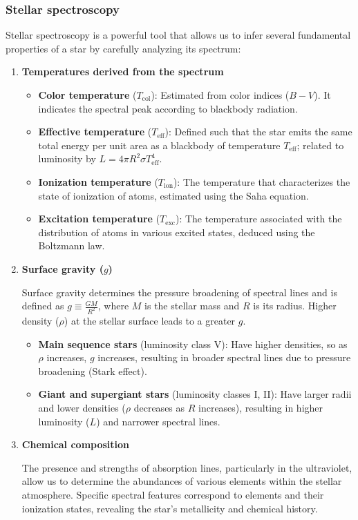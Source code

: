 \subsubsection{Stellar spectroscopy}

Stellar spectroscopy is a powerful tool that allows us to infer several fundamental properties of a star by carefully analyzing its spectrum:

\begin{enumerate}
    \item \textbf{Temperatures derived from the spectrum}
    \begin{itemize}
        \item \textbf{Color temperature} ($T_\mathrm{col}$): Estimated from color indices ($B - V$). It indicates the spectral peak according to blackbody radiation.
        \item \textbf{Effective temperature} ($T_\mathrm{eff}$): Defined such that the star emits the same total energy per unit area as a blackbody of temperature $T_\mathrm{eff}$; related to luminosity by $L = 4 \pi R^2 \sigma T_\mathrm{eff}^4$.
        \item \textbf{Ionization temperature} ($T_\mathrm{ion}$): The temperature that characterizes the state of ionization of atoms, estimated using the Saha equation.
        \item \textbf{Excitation temperature} ($T_\mathrm{exc}$): The temperature associated with the distribution of atoms in various excited states, deduced using the Boltzmann law.
    \end{itemize}

    \item \textbf{Surface gravity ($g$)} 
    
    Surface gravity determines the pressure broadening of spectral lines and is defined as $g \equiv \frac{GM}{R^2}$, where $M$ is the stellar mass and $R$ is its radius. Higher density ($\rho$) at the stellar surface leads to a greater $g$.
    
    \begin{itemize}
        \item \textbf{Main sequence stars} (luminosity class V): Have higher densities, so as $\rho$ increases, $g$ increases, resulting in broader spectral lines due to pressure broadening (Stark effect).
        \item \textbf{Giant and supergiant stars} (luminosity classes I, II): Have larger radii and lower densities ($\rho$ decreases as $R$ increases), resulting in higher luminosity ($L$) and narrower spectral lines.
    \end{itemize}

    \item \textbf{Chemical composition}
    
    The presence and strengths of absorption lines, particularly in the ultraviolet, allow us to determine the abundances of various elements within the stellar atmosphere. Specific spectral features correspond to elements and their ionization states, revealing the star's metallicity and chemical history.
\end{enumerate}

